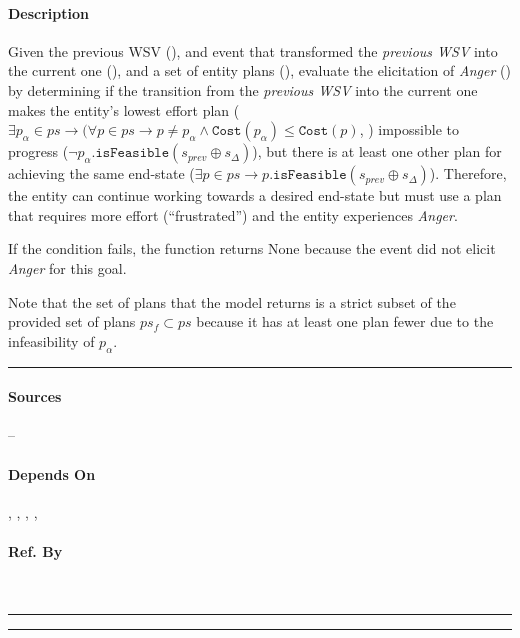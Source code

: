 \paragraph{Description} Given the previous WSV (), and
event that transformed the \textit{previous WSV} into the current one
(), and a set of entity plans (),
evaluate the elicitation of \textit{Anger} () by
determining if the transition from the \textit{previous WSV} into the current
one makes the entity's lowest effort plan ($\exists p_\alpha \in ps
\rightarrow (\forall p \in ps \rightarrow p \neq p_\alpha \land
\mathtt{Cost}(p_\alpha) \leq \mathtt{Cost}(p)$, )
impossible to progress ($\neg p_\alpha.\mathtt{isFeasible}(s_{prev} \oplus
s_\Delta)$), but there is at least one other plan for achieving the same
end-state ($\exists p \in ps \rightarrow p.\mathtt{isFeasible}(s_{prev} \oplus
s_\Delta)$). Therefore, the entity can continue working towards a desired
end-state but must use a plan that requires more effort (``frustrated'') and
the entity experiences \textit{Anger}.

If the condition fails, the function returns None because the event did not
elicit \textit{Anger} for this goal.

Note that the set of plans that the model returns is a strict subset of the
provided set of plans $ps_f \subset ps$ because it has at least one plan fewer
due to the infeasibility of $p_\alpha$. \\\hrule

\paragraph{Sources} --

\paragraph{Depends On} , ,
, , 

\paragraph{Ref. By}  \\\hrule\vspace{0.5mm}\hrule

~\newline

